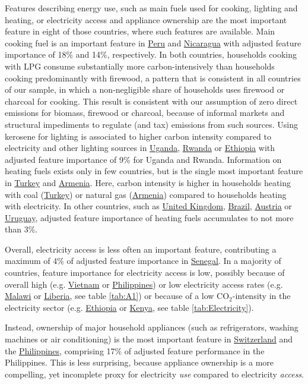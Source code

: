 \documentclass[12pt, a4paper]{article}
\begin{document}
Features describing energy use, such as main fuels used for cooking, lighting and heating, or electricity access and appliance ownership are the most important feature in eight of those countries, where such features are available. Main cooking fuel is an important feature in \hyperref[fig:5b_PER]{Peru} and \hyperref[fig:5b_NIC]{Nicaragua} with adjusted feature importance of 18\% and 14\%, respectively. In both countries, households cooking with LPG consume substantially more carbon-intensively than households cooking predominantly with firewood, a pattern that is consistent in all countries of our sample, in which a non-negligible share of households uses firewood or charcoal for cooking. This result is consistent with our assumption of zero direct emissions for biomass, firewood or charcoal, because of informal markets and structural impediments to regulate (and tax) emissions from such sources. Using kerosene for lighting is associated to higher carbon intensity compared to electricity and other lighting sources in \hyperref[fig:5b_UGA]{Uganda}, \hyperref[fig:5b_RWA]{Rwanda} or \hyperref[fig:5b_ETH]{Ethiopia} with adjusted feature importance of 9\% for Uganda and Rwanda. Information on heating fuels exists only in few countries, but is the single most important feature in \hyperref[fig:5b_TUR]{Turkey} and \hyperref[fig:5b_ARM]{Armenia}. Here, carbon intensity is higher in households heating with coal (\hyperref[fig:5b_TUR]{Turkey}) or natural gas (\hyperref[fig:5b_ARM]{Armenia}) compared to households heating with electricity. In other countries, such as \hyperref[fig:5b_GBR]{United Kingdom}, \hyperref[fig:5b_BRA]{Brazil}, \hyperref[fig:5b_AUT]{Austria} or \hyperref[fig:5b_URY]{Uruguay}, adjusted feature importance of heating fuels accumulates to not more than 3\%.

Overall, electricity access is less often an important feature, contributing a maximum of 4\% of adjusted feature importance in \hyperref[fig:5b_SEN]{Senegal}. In a majority of countries, feature importance for electricity access is low, possibly because of overall high (e.g. \hyperref[fig:5b_VNM]{Vietnam} or \hyperref[fig:5b_PHL]{Philippines}) or low electricity access rates (e.g. \hyperref[fig:5b_MWI]{Malawi} or \hyperref[fig:5b_LBR]{Liberia}, see table \ref{tab:A1}) or because of a low CO$_{2}$-intensity in the electricity sector (e.g. \hyperref[fig:5b_ETH]{Ethiopia} or \hyperref[fig:5b_KEN]{Kenya}, see table \ref{tab:Electricity}).

Instead, ownership of major household appliances (such as refrigerators, washing machines or air conditioning) is the most important feature in \hyperref[fig:5b_CHE]{Switzerland} and the \hyperref[fig:5b_PHL]{Philippines}, comprising 17\% of adjusted feature performance in the Philippines. This is less surprising, because appliance ownership is a more compelling, yet incomplete proxy for electricity \textit{use} compared to electricity \textit{access}.
\end{document}

